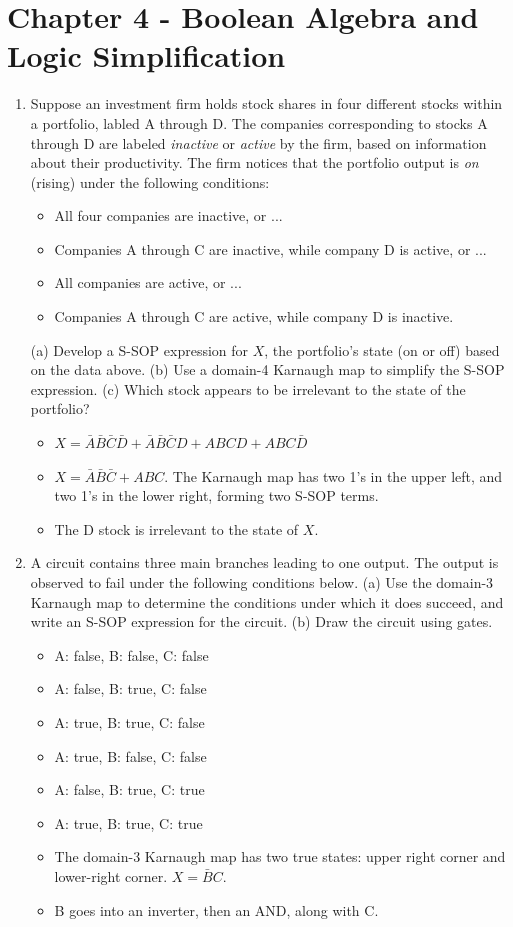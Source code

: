 \documentclass[10pt]{article}
\begin{document}
\section{Chapter 4 - Boolean Algebra and Logic Simplification}
\begin{enumerate}
\item Suppose an investment firm holds stock shares in four different stocks within a portfolio, labled A through D.  The companies corresponding to stocks A through D are labeled \textit{inactive} or \textit{active} by the firm, based on information about their productivity.  The firm notices that the portfolio output is \textit{on} (rising) under the following conditions:
\begin{itemize}
\item All four companies are inactive, or ...
\item Companies A through C are inactive, while company D is active, or ...
\item All companies are active, or ...
\item Companies A through C are active, while company D is inactive.
\end{itemize}
(a) Develop a S-SOP expression for $X$, the portfolio's state (on or off) based on the data above. (b) Use a domain-4 Karnaugh map to simplify the S-SOP expression. (c) Which stock appears to be irrelevant to the state of the portfolio?
\begin{itemize}
\item $X = \bar{A}\bar{B}\bar{C}\bar{D} + \bar{A}\bar{B}\bar{C}D + ABCD + ABC\bar{D}$
\item $X = \bar{A}\bar{B}\bar{C}+ABC$.  The Karnaugh map has two 1's in the upper left, and two 1's in the lower right, forming two S-SOP terms.
\item The D stock is irrelevant to the state of $X$.
\end{itemize}
\item A circuit contains three main branches leading to one output.  The output is observed to fail under the following conditions below.  (a) Use the domain-3 Karnaugh map to determine the conditions under which it does succeed, and write an S-SOP expression for the circuit. (b) Draw the circuit using gates.
\begin{itemize}
\item A: false, B: false, C: false
\item A: false, B: true, C: false
\item A: true, B: true, C: false
\item A: true, B: false, C: false
\item A: false, B: true, C: true
\item A: true, B: true, C: true
\end{itemize}
\begin{itemize}
\item The domain-3 Karnaugh map has two true states: upper right corner and lower-right corner.  $X=\bar{B}C$.
\item B goes into an inverter, then an AND, along with C.
\end{itemize}
\end{enumerate}
\end{document}
